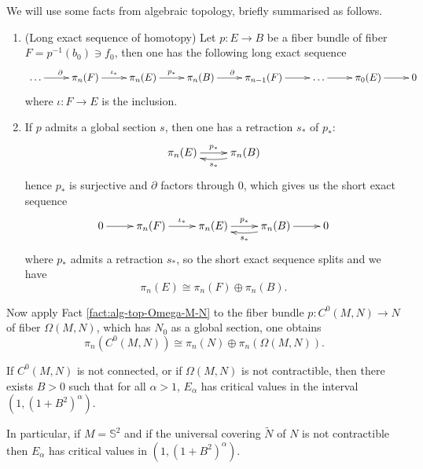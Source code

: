 We will use some facts from algebraic topology, briefly summarised as follows.

\begin{fact}
\label{fact:alg-top-Omega-M-N}
\begin{enumerate}
\item (Long exact sequence of homotopy) Let \(p: E \longrightarrow B\) be a fiber bundle
of fiber \(F = p^{-1}(b_0) \ni f_0\), then one has the following long exact sequence
\[
    \xymatrix{
    \dots \ar@{->}[r]^{\partial} & \pi_n(F) \ar@{->}[r]^{\iota_*} & \pi_n(E) \ar@{->}[r]^{p_*} & \pi_n(B) \ar@{->}[r]^{\partial} & \pi_{n-1}(F) \ar@{->}[r] & \dots \ar@{->}[r] & \pi_0(E) \ar@{->}[r] & 0
    }
   \]
 where \(\iota: F \longrightarrow E\) is the inclusion.
\item If \(p\) admits a global section \(s\), then one has a retraction \(s_*\) of \(p_*\):
\[
    \xymatrix{
    \pi_n(E) \ar@{->}[r]^{p_*} & \pi_n(B) \ar@/^/@{->}[l]^{s_*}
    }
   \]
hence \(p_*\) is surjective and \(\partial\) factors through \(0\), which gives
us the short exact sequence
\[
    \xymatrix{
    0 \ar@{->}[r] & \pi_n(F) \ar@{->}[r]^{\iota_*} & \pi_n(E) \ar@{->}[r]^{p_*} & \pi_n(B) \ar@/^/@{->}[l]^{s_*} \ar@{->}[r] & 0
    }
   \]
where \(p_*\) admits a retraction \(s_*\), so the short exact sequence splits and
we have
\[
   \pi_n(E) \cong \pi_n(F) \oplus \pi_n(B).
   \]
\end{enumerate}
\end{fact}

Now apply Fact \ref{fact:alg-top-Omega-M-N} to the fiber bundle \(p: C^0(M,N)
\longrightarrow N\) of fiber \(\Omega(M,N)\), which has \(N_0\) as a global section,
one obtains
\[
 \pi_n(C^0(M,N)) \cong \pi_n(N) \oplus \pi_n(\Omega(M,N)).
\]


\begin{theorem}
\label{thm:3-nontrivial-crit}
If \(C^0(M,N)\) is not connected, or if \(\Omega(M,N)\) is not contractible, then
there exists \(B>0\) such that for all \(\alpha >1\), \(E_\alpha\) has critical
values in the interval \((1, (1+B^2)^\alpha)\). 

In particular, if \(M=\mathbb{S}^2\) and if the universal covering \(\tilde N\) of \(N\) is not contractible then \(E_\alpha\) has critical values in \((1, (1+B^2)^\alpha)\).
\end{theorem}


